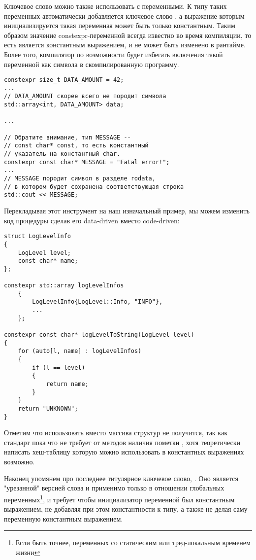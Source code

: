 Ключевое слово  можно также использовать с переменными. К типу таких переменных автоматически добавляется ключевое слово , а выражение которым инициализируется такая переменная может быть только константным. Таким образом значение constexpr-переменной всегда известно во время компиляции, то есть является константным выражением, и не может быть изменено в рантайме. Более того, компилятор по возможности будет избегать включения такой переменной как символа в скомпилированную программу.
\begin{verbatim}
constexpr size_t DATA_AMOUNT = 42;
...
// DATA_AMOUNT скорее всего не породит символа
std::array<int, DATA_AMOUNT> data;

...

// Обратите внимание, тип MESSAGE --
// const char* const, то есть константный
// указатель на константный char.
constexpr const char* MESSAGE = "Fatal error!";
...
// MESSAGE породит символ в разделе rodata,
// в котором будет сохранена соответствующая строка
std::cout << MESSAGE;
\end{verbatim}
Перекладывая этот инструмент на наш изначальный пример, мы можем изменить код процедуры  сделав его data-driven вместо code-driven:
\begin{verbatim}
struct LogLevelInfo
{
    LogLevel level;
    const char* name;
};

constexpr std::array logLevelInfos
    {
        LogLevelInfo{LogLevel::Info, "INFO"},
        ...
    };

constexpr const char* logLevelToString(LogLevel level)
{
    for (auto[l, name] : logLevelInfos)
    {
        if (l == level)
        {
            return name;
        }
    }
    return "UNKNOWN";
}
\end{verbatim}
Отметим что использовать  вместо массива структур не получится, так как стандарт пока что не требует от методов  наличия пометки , хотя теоретически написать хеш-таблицу которую можно использовать в константных выражениях возможно.

Наконец упомянем про последнее титулярное ключевое слово, . Оно является "урезанной" версией слова  и применимо только в отношении глобальных переменных\footnote{Если быть точнее, переменных со статическим или тред-локальным временем жизни}, и требует чтобы инициализатор переменной был константным выражением, не добавляя при этом константности к типу, а также не делая саму переменную константным выражением.

